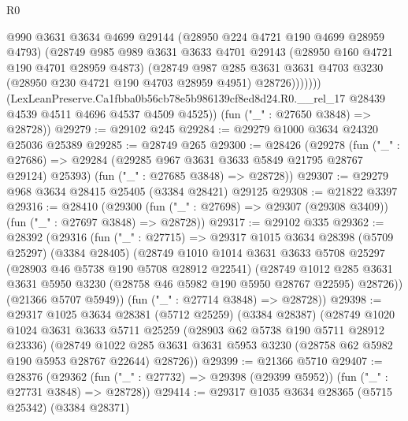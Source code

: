 \begin{lexlean}{R0}
\begin{coremodule}
                  @990
                  @3631
                  @3634
                  @4699
                  @29144
                  (@28950 @224 @4721 @190 @4699 @28959 @4793)
                  (@28749
                    @985
                    @989
                    @3631
                    @3633
                    @4701
                    @29143
                    (@28950 @160 @4721 @190 @4701 @28959 @4873)
                    (@28749
                      @987
                      @285
                      @3631
                      @3631
                      @4703
                      @3230
                      (@28950 @230 @4721 @190 @4703 @28959 @4951)
                      @28726)))))))
        (LexLeanPreserve.Ca1fbba0b56cb78e5b986139cf8ed8d24.R0.__rel_17
          @28439
          @4539
          @4511
          @4696
          @4537
          @4509
          @4525))
      (fun ("_" : @27650 @3848) => @28728))
@29279 := @29102 @245
@29284 := @29279 @1000 @3634 @24320 @25036 @25389
@29285 := @28749 @265
@29300 := @28426
    (@29278
      (fun ("_" : @27686) => @29284 (@29285 @967 @3631 @3633 @5849 @21795 @28767 @29124) @25393)
      (fun ("_" : @27685 @3848) => @28728))
@29307 := @29279 @968 @3634 @28415 @25405 (@3384 @28421) @29125
@29308 := @21822 @3397
@29316 := @28410
    (@29300 (fun ("_" : @27698) => @29307 (@29308 @3409)) (fun ("_" : @27697 @3848) => @28728))
@29317 := @29102 @335
@29362 := @28392
    (@29316
      (fun ("_" : @27715) =>
      @29317
        @1015
        @3634
        @28398
        (@5709 @25297)
        (@3384 @28405)
        (@28749
          @1010
          @1014
          @3631
          @3633
          @5708
          @25297
          (@28903 @46 @5738 @190 @5708 @28912 @22541)
          (@28749
            @1012
            @285
            @3631
            @3631
            @5950
            @3230
            (@28758 @46 @5982 @190 @5950 @28767 @22595)
            @28726))
        (@21366 @5707 @5949))
      (fun ("_" : @27714 @3848) => @28728))
@29398 := @29317
    @1025
    @3634
    @28381
    (@5712 @25259)
    (@3384 @28387)
    (@28749
      @1020
      @1024
      @3631
      @3633
      @5711
      @25259
      (@28903 @62 @5738 @190 @5711 @28912 @23336)
      (@28749
        @1022
        @285
        @3631
        @3631
        @5953
        @3230
        (@28758 @62 @5982 @190 @5953 @28767 @22644)
        @28726))
@29399 := @21366 @5710
@29407 := @28376
    (@29362 (fun ("_" : @27732) => @29398 (@29399 @5952)) (fun ("_" : @27731 @3848) => @28728))
@29414 := @29317 @1035 @3634 @28365 (@5715 @25342) (@3384 @28371)

\end{coremodule}
\end{lexlean}
